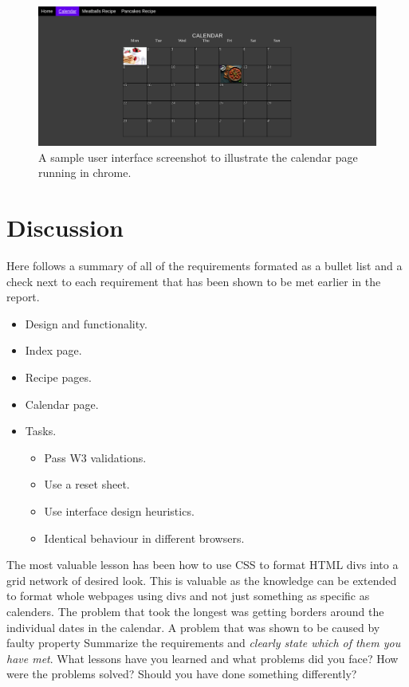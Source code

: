 \documentclass[a4paper]{scrartcl}
\begin{document}
\begin{figure}[h!]
    \begin{center}
        \includegraphics[scale=0.2]{images/chrome.png}
        \caption{A sample user interface screenshot to illustrate the calendar page running in chrome.}
        \label{fig:chrome}
    \end{center}
\end{figure}

\section{Discussion}

Here follows a summary of all of the requirements formated as a bullet list and a check next to each requirement that has been shown to be met earlier in the report.
\begin{itemize}
    \item Design and functionality. \checkmark
    \item Index page. \checkmark
    \item Recipe pages. \checkmark
    \item Calendar page. \checkmark
    \item Tasks. \checkmark
    \begin {itemize}
        \item Pass W3 validations. \checkmark
        \item Use a reset sheet. \checkmark
        \item Use interface design heuristics. \checkmark
        \item Identical behaviour in different browsers. \checkmark
    \end{itemize}

\end{itemize}

The most valuable lesson has been how to use CSS to format HTML divs into a grid network of desired look. This is valuable as the knowledge can be extended to format whole webpages using divs and not just something as specific as calenders. The problem that took the longest was getting borders around the individual dates in the calendar. A problem that was shown to be caused by faulty property
\noindent Summarize the requirements and \textit{clearly state which of them you have met}. What lessons have you learned and what problems did you face? How were the problems solved? Should you have done something differently?
\end{document}
